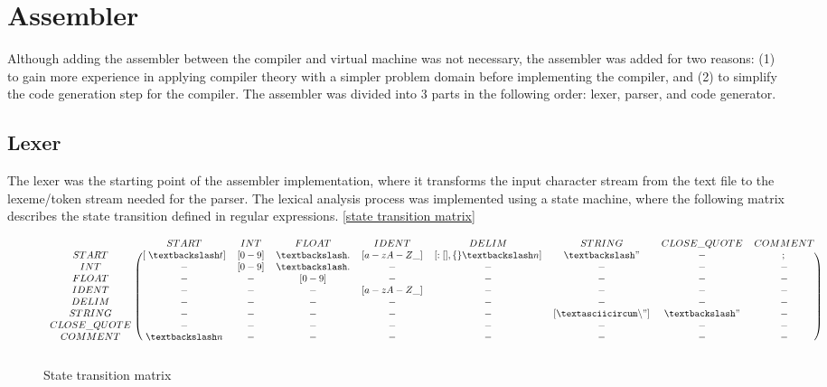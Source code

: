 \documentclass[manuscript,screen,nonacm]{acmart}
\begin{document}
\section{Assembler}
Although adding the assembler between the compiler and virtual machine was not necessary, the assembler was added for two reasons: (1) to gain more experience in applying compiler theory with a simpler problem domain before implementing the compiler, and (2) to simplify the code generation step for the compiler. The assembler was divided into 3 parts in the following order: lexer, parser, and code generator.

\subsection{Lexer}
The lexer was the starting point of the assembler implementation, where it transforms the input character stream from the text file to the lexeme/token stream needed for the parser. The lexical analysis process was implemented using a state machine, where the following matrix describes the state transition defined in regular expressions.
\autoref{state transition matrix}

\begin{figure}[H]
\[
\begin{blockarray}{ccccccccc}
& START & INT & FLOAT & IDENT & DELIM & STRING & CLOSE\_QUOTE & COMMENT \\
\begin{block}{c(cccccccc)}
 START & [\hspace{0.1cm} \textbackslash t] & [0-9] & \textbackslash . & [a-zA-Z\_] & [:[],\{\}\textbackslash n] & \textbackslash " & - & ; \\
 INT & - & [0-9] & \textbackslash . & - & - & - & - & -\\
 FLOAT & - & - & [0-9] & - & - & - & - & - \\
 IDENT & - & - & - & [a-zA-Z\_] & - & - & - & - \\
 DELIM & - & - & - & - & - & - & - & - \\
 STRING & - & - & - & - & - & [\textasciicircum \backslash "] & \textbackslash " & - \\
 CLOSE\_QUOTE & - & - & - & - & - & - & - & -\\
 COMMENT & \textbackslash n & - & - & - & - & - & - & -\\
\end{block}
\end{blockarray}
\]
\caption{State transition matrix} 
\label{state transition matrix}
\end{figure}
\end{document}
